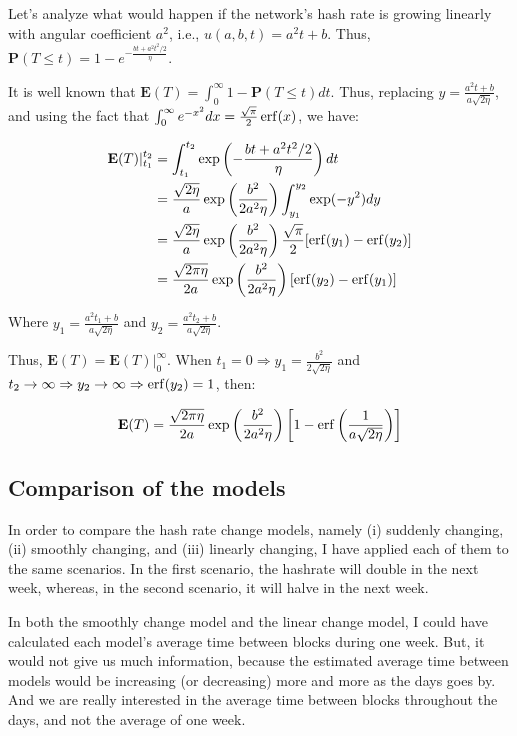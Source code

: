 Let's analyze what would happen if the network's hash rate is growing linearly with angular coefficient $a^2$, i.e., $u(a, b, t) = a^2t + b$. Thus, $\mathbf{P}(T \leq t) = 1 - e^{-\frac{bt + a^2t^2/2}{\eta}}$.

It is well known that $\mathbf{E}(T) = \int_{0}^{\infty} 1 - \mathbf{P}(T \leq t) dt$. Thus, replacing $y = \frac{a^2 t + b}{a \sqrt{2 \eta}}$, and using the fact that $\int_0^\infty e^{-x^2} dx = \frac{\sqrt{\pi}}{2} \operatorname{erf}(x)$, we have:

\begin{align}
\mathbf{E}(T)|_{t_1}^{t_2} &= \int_{t_1}^{t_2} \exp \left( - \frac{bt + a^2 t^2/2}{\eta} \right) dt \nonumber \\
	&= \frac{\sqrt{2 \eta}}{a} \exp \left( \frac{b^2}{2a^2 \eta} \right) \int_{y_1}^{y_2}  \exp(-y^2) dy \nonumber \\
	&= \frac{\sqrt{2 \eta}}{a} \exp \left( \frac{b^2}{2a^2 \eta} \right) \frac{\sqrt{\pi}}{2} [\operatorname{erf}(y_1) - \operatorname{erf}(y_2)] \nonumber \\
	&= \frac{\sqrt{2 \pi \eta}}{2a} \exp \left( \frac{b^2}{2a^2 \eta} \right) \left[\operatorname{erf}(y_2) - \operatorname{erf}(y_1) \right]
\end{align}

Where $y_1 = \frac{a^2 t_1 + b}{a \sqrt{2 \eta}}$ and $y_2 = \frac{a^2 t_2 + b}{a \sqrt{2 \eta}}$.

Thus, $\mathbf{E}(T) = \mathbf{E}(T)|_0^\infty$. When $t_1 = 0 \Rightarrow y_1 = \frac{b^2}{2 \sqrt{2 \eta}}$ and $t_2 \rightarrow \infty \Rightarrow y_2 \rightarrow \infty \Rightarrow \operatorname{erf}(y_2) = 1$, then:

$$
\mathbf{E}(T) = \frac{\sqrt{2 \pi \eta}}{2a} \exp \left( \frac{b^2}{2a^2 \eta} \right) \left[1 - \operatorname{erf}\left(\frac{1}{a \sqrt{2 \eta}}\right)\right]
$$


\subsection{Comparison of the models}

In order to compare the hash rate change models, namely (i) suddenly changing, (ii) smoothly changing, and (iii) linearly changing, I have applied each of them to the same scenarios. In the first scenario, the hashrate will double in the next week, whereas, in the second scenario, it will halve in the next week.

In both the smoothly change model and the linear change model, I could have calculated each model's average time between blocks during one week. But, it would not give us much information, because the estimated average time between models would be increasing (or decreasing) more and more as the days goes by. And we are really interested in the average time between blocks throughout the days, and not the average of one week.

